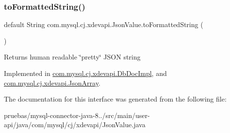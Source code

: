 \subsubsection{\texorpdfstring{to\+Formatted\+String()}{toFormattedString()}}
{\footnotesize\ttfamily default String com.\+mysql.\+cj.\+xdevapi.\+Json\+Value.\+to\+Formatted\+String (\begin{DoxyParamCaption}{ }\end{DoxyParamCaption})}

\begin{DoxyReturn}{Returns}
human readable \char`\"{}pretty\char`\"{} J\+S\+ON string 
\end{DoxyReturn}


Implemented in \mbox{\hyperlink{classcom_1_1mysql_1_1cj_1_1xdevapi_1_1_db_doc_impl_a4880b999d135b6a871d605b523fc1529}{com.\+mysql.\+cj.\+xdevapi.\+Db\+Doc\+Impl}}, and \mbox{\hyperlink{classcom_1_1mysql_1_1cj_1_1xdevapi_1_1_json_array_a8a735ca15493e8154b46976ffb56204e}{com.\+mysql.\+cj.\+xdevapi.\+Json\+Array}}.



The documentation for this interface was generated from the following file\+:\begin{DoxyCompactItemize}
\item 
pruebas/mysql-\/connector-\/java-\/8../src/main/user-\/api/java/com/mysql/cj/xdevapi/Json\+Value.\+java\end{DoxyCompactItemize}
